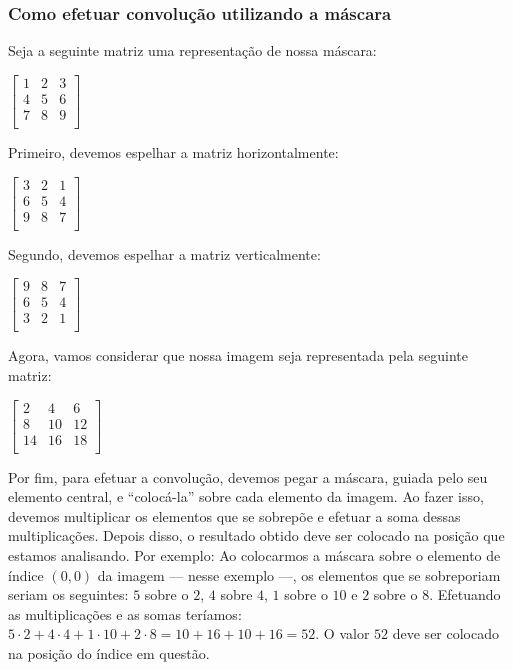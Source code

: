 \documentclass[a4paper, 12pt]{article}
\begin{document}
\subsubsection{Como efetuar convolução utilizando a máscara}
Seja a seguinte matriz uma representação de nossa máscara:
\begin{center}
	$
	\begin{bmatrix}
		1 & 2 & 3 \\
		4 & 5 & 6 \\
		7 & 8 & 9 \\
	\end{bmatrix}	
	$
\end{center}
Primeiro, devemos espelhar a matriz horizontalmente:
\begin{center}
	$
	\begin{bmatrix}
		3 & 2 & 1 \\
		6 & 5 & 4 \\
		9 & 8 & 7 \\
	\end{bmatrix}	
	$
\end{center}
Segundo, devemos espelhar a matriz verticalmente:
\begin{center}
	$
	\begin{bmatrix}
		9 & 8 & 7 \\
		6 & 5 & 4 \\
		3 & 2 & 1 \\
	\end{bmatrix}	
	$
\end{center}
Agora, vamos considerar que nossa imagem seja representada pela seguinte matriz:
\begin{center}
	$
	\begin{bmatrix}
		2   & 4   & 6 \\
		8   & 10  & 12 \\
		14  & 16  & 18 \\
	\end{bmatrix}	
	$
\end{center}
Por fim, para efetuar a convolução, devemos pegar a máscara, guiada pelo seu elemento central, e ``colocá-la'' sobre cada elemento da imagem. 
Ao fazer isso, devemos multiplicar os elementos que se sobrepõe e efetuar a soma dessas multiplicações. Depois disso, o resultado obtido deve ser 
colocado na posição que estamos analisando. Por exemplo: Ao colocarmos a máscara sobre o elemento de índice $(0, 0)$ da 
imagem --- nesse exemplo ---, os elementos que se sobreporiam 
seriam os seguintes: $5$ sobre o $2$, $4$ sobre $4$, $1$ sobre o $10$ e $2$ sobre o $8$. Efetuando as multiplicações e as somas teríamos: 
$5 \cdot 2 + 4 \cdot 4 + 1 \cdot 10 + 2 \cdot 8 = 10 + 16 + 10 + 16 = 52$. O valor $52$ deve ser colocado na posição do índice em questão.
\end{document}
